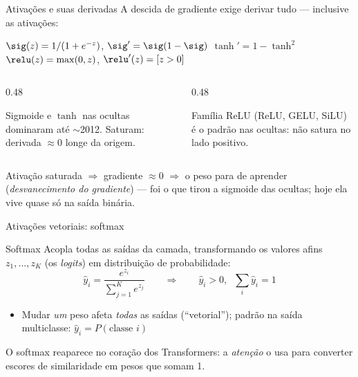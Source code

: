 \documentclass[aspectratio=169, 11pt]{beamer}
\begin{document}
\begin{frame}{Ativações e suas derivadas}
  A descida de gradiente exige derivar tudo — inclusive as ativações:
  \begin{center}\small
    $\sig(z) = 1/(1+e^{-z})$,\; $\sig' = \sig(1-\sig)$
    \qquad
    $\tanh' = 1 - \tanh^2$
    \qquad
    $\relu(z) = \max(0, z)$,\; $\relu'(z) = [z > 0]$
  \end{center}

  \begin{columns}[T]
    \begin{column}{0.48\textwidth}
      \begin{tcolorbox}[iccaixa=icCinza, title={Histórico}]
        \small Sigmoide e $\tanh$ nas ocultas dominaram até $\sim$2012.
        Saturam: derivada $\approx 0$ longe da origem.
      \end{tcolorbox}
    \end{column}
    \begin{column}{0.48\textwidth}
      \begin{tcolorbox}[iccaixa=icVerde, title={Moderno}]
        \small Família ReLU (ReLU, GELU, SiLU) é o padrão nas ocultas:
        não satura no lado positivo.
      \end{tcolorbox}
    \end{column}
  \end{columns}

  \begin{alertabox}
    Ativação saturada $\Rightarrow$ gradiente $\approx 0$ $\Rightarrow$ o peso
    \alert{para de aprender} (\emph{desvanecimento do gradiente}) — foi o que
    tirou a sigmoide das ocultas; hoje ela vive quase só na saída binária.
  \end{alertabox}
\end{frame}

\begin{frame}{Ativações vetoriais: softmax}
  \begin{defbox}{Softmax}
    Acopla todas as saídas da camada, transformando os valores afins
    $z_1, \dots, z_K$ (os \emph{logits}) em distribuição de probabilidade:
    \[
      \hat{y}_i = \frac{e^{z_i}}{\sum_{j=1}^{K} e^{z_j}}
      \qquad\Longrightarrow\qquad
      \hat{y}_i > 0, \;\; \sum_i \hat{y}_i = 1
    \]
  \end{defbox}

  \begin{itemize}\setlength{\itemsep}{0.2ex}
    \item Mudar \emph{um} peso afeta \emph{todas} as saídas (``vetorial'');
          padrão na saída multiclasse: $\hat{y}_i = P(\text{classe } i)$
  \end{itemize}

  \begin{ideiabox}
    O softmax reaparece no coração dos Transformers: a \emph{atenção} o usa
    para converter escores de similaridade em pesos que somam 1.
  \end{ideiabox}
\end{frame}
\end{document}
